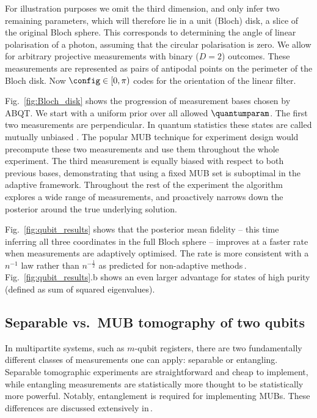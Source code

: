 For illustration purposes we omit the third dimension, and only infer two remaining parameters, which will therefore lie in a unit (Bloch) disk, a slice of the original Bloch sphere. This corresponds to determining the angle of linear polarisation of a photon, assuming that the circular polarisation is zero. We allow for arbitrary projective measurements with binary ($D = 2$) outcomes. These measurements are represented as pairs of antipodal points on the perimeter of the Bloch disk. Now $\config\in[0,\pi)$ codes for the orientation of the linear filter.
	
Fig.\ \ref{fig:Bloch_disk} shows the progression of measurement bases chosen by ABQT. We start with a uniform prior over all allowed $\quantumparam$. The first two measurements are perpendicular. In quantum statistics these states are called mutually unbiased \citep{MUBExperiment}. The popular MUB technique for experiment design would precompute these two measurements and use them throughout the whole experiment. The third measurement is equally biased with respect to both previous bases, demonstrating that using a fixed MUB set is suboptimal in the adaptive framework. Throughout the rest of the experiment the algorithm explores a wide range of measurements, and proactively narrows down the posterior around the true underlying solution.

Fig.\ \ref{fig:qubit_results} shows that the posterior mean fidelity -- this time inferring all three coordinates in the full Bloch sphere -- improves at a faster rate when measurements are adaptively optimised. The rate is more consistent with a $n^{-1}$ law rather than $n^{-\frac{1}{2}}$ as predicted for non-adaptive methods\,\cite[][and refs.]{MUBExperiment}. Fig.\ \ref{fig:qubit_results}.b shows an even larger advantage for states of high purity (defined as sum of squared eigenvalues).

\subsection{Separable vs.\ MUB tomography of two qubits}

In multipartite systems, such as $m$-qubit registers, there are two fundamentally different classes of measurements one can apply: separable or entangling. Separable tomographic experiments are straightforward and cheap to implement, while entangling measurements are statistically more thought to be statistically more powerful. Notably, entanglement is required for implementing MUBs. These differences are discussed extensively in\,\citep{MUBExperiment}.

